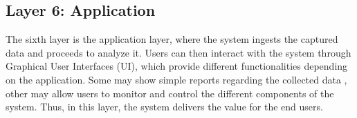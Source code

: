 
\subsection{Layer 6: Application}
\label{sec:iot-model-layer6}



The sixth layer is the application layer, where the system ingests the captured data and proceeds to analyze it. Users can then interact with the system through Graphical User Interfaces (UI), which provide different functionalities depending on the application. Some may show simple reports regarding the collected data \cite{Doukas2012, Wu2020}, other may allow users to monitor and control the different components of the system. Thus, in this layer, the system delivers the value for the end users.








